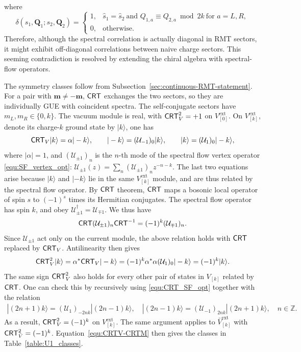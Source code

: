 \documentclass[11pt]{article}
\numberwithin{equation}{section}
\begin{document}
where
\begin{equation}
\delta(s_1,\mathbf Q_1;s_2,\mathbf Q_2)
 =\begin{cases}
 1,&\hat s_1=\hat s_2\ \text{and }Q_{1,a}\equiv Q_{2,a}\bmod2k
       \ \text{for }a=L,R,\\
 0,&\text{otherwise}.
 \end{cases}
\label{SF_delta_bdy}
\end{equation}
Therefore, although the spectral correlation is actually diagonal in RMT sectors, it might exhibit
off-diagonal correlations between naive charge sectors. This seeming contradiction is resolved by
extending the chiral algebra with spectral-flow operators.

The symmetry classes follow from Subsection~\ref{sec:continuous-RMT-statement}. For a pair with $\mathbf m\ne-\mathbf m$, $\mathsf{CRT}$ exchanges the two sectors, so they are individually GUE with coincident spectra. The self-conjugate sectors have $m_L,m_R\in\{0,k\}$. The vacuum module is real, with $\mathsf{CRT}_V^2=+1$ on $V_{[0]}^{\mathrm{ext}}$. On $V_{[k]}^{\mathrm{ext}}$,  denote its charge-$k$ ground state by $|k\rangle$, one has
\begin{equation}
\mathsf{CRT}_V|k\rangle=\alpha|-k\rangle,
\qquad |-k\rangle=(\mathcal U_{-1})_0|k\rangle,
\qquad |k\rangle=(\mathcal U_1)_0|-k\rangle,
\end{equation}
where $|\alpha|=1$, and $(\mathcal U_{\pm1})_n $ is the $n$-th mode of the spectral flow vertex operator \eqref{equ:SF_vertex_opt}: $\mathcal U_{\pm1}(z)=\sum_n (\mathcal U_{\pm1})_n z^{-n-k}$. The last two equations arise because $|k\rangle$ and $|-k\rangle$ lie in the same $V_{[k]}^{\mathrm{ext}}$ module, and are thus related by the spectral flow operator.  By $\mathsf{CRT}$ theorem, $\mathsf{CRT}$ maps a bosonic local operator of spin $s$ to $(-1)^s$ times its Hermitian conjugates. The spectral flow operator has spin $k$, and obey $\mathcal U_{\pm1}^{\dagger}=\mathcal U_{\mp1}$. We thus have
\begin{align}
    \mathsf{CRT}(\mathcal U_{\pm1})_n \mathsf{CRT}^{-1}=(-1)^k (\mathcal U_{\mp1})_n.
    \label{equ:CRT_SF_opt}
\end{align}
Since $\mathcal U_{\pm1}$ act only on the current module, the above relation holds with $\mathsf{CRT}$ replaced by $\mathsf{CRT}_V$. Antilinearity  then gives
\begin{align}
    \mathsf{CRT}_V^2 |k\rangle= \alpha^{*} \mathsf{CRT}_V|-k\rangle=(-1)^k \alpha^* \alpha (\mathcal U_{1})_0|-k\rangle= (-1)^k|k\rangle.
\end{align}
The same sign $ \mathsf{CRT}_V^2$ also holds  for every other pair of states in $V_{[k]}$ related by $\mathsf{CRT}$. One can check this by recursively using \eqref{equ:CRT_SF_opt} together with the relation
\begin{align}
    |(2n+1)k\rangle =(\mathcal U_{1})_{-2nk}|(2n-1)k\rangle, \quad  |(2n-1)k\rangle =(\mathcal U_{-1})_{2nk}|(2n+1)k\rangle, \quad n\in\mathbb{Z}.
\end{align}
As a result, $\mathsf{CRT}_V^2=(-1)^k$ on $V_{[k]}^{\mathrm{ext}}$. The same argument applies to $\bar{V}_{[k]}^{\mathrm{ext}}$ with $\mathsf{CRT}_{\bar{V}}^2=(-1)^k$. Equation~\eqref{equ:CRTV-CRTM} then gives the classes in Table~\ref{table:U1_classes}.
\end{document}

